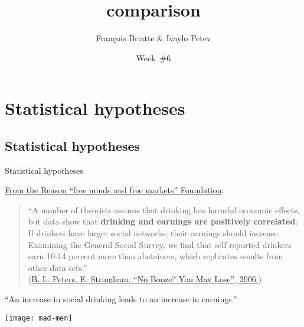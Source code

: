 \documentclass[t]{beamer}
\title{comparison}
\author{François Briatte \& Ivaylo Petev}
\date{Week~\#6}
\begin{document}

	\section{Statistical hypotheses}

	\subsection{Statistical hypotheses}

	\begin{frame}[t]{Statistical hypotheses}
		
		\href{http://reason.org/}{From the Reason ``free minds and free markets'' Foundation}:\\[1em]

		\begin{quote}
		``A number of theorists assume that drinking has harmful economic effects, but data show that \textbf{drinking and earnings are positively correlated}. \textbf{} If drinkers have larger social networks, their earnings should increase. Examining the General Social Survey, we find that self-reported drinkers earn 10-14 percent more than abstainers, which replicates results from other data sets.''\\[1em]
		
		(\href{http://reason.org/news/show/127594.html}{B. L. Peters, E. Stringham, ``No Booze? You May Lose'', 2006.})
		\end{quote}

		 ``An increase in social drinking leads to an increase in earnings.''
	\end{frame}

  \begin{frame}[plain, c]{}

		\begin{center}
\texttt{[image: mad-men]}
    \end{center}
		  
  \end{frame}
	
\end{document}
